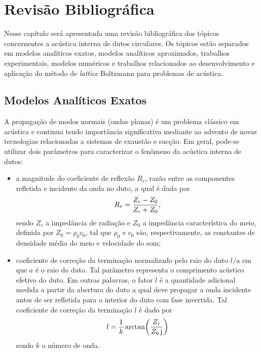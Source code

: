 \chapter{Revisão Bibliográfica}

Nesse capítulo será apresentada uma revisão bibliográfica dos tópicos concernentes a acústica interna de dutos circulares. Os tópicos estão separados em modelos analíticos exatos, modelos analíticos aproximados, trabalhos experimentais, modelos numéricos e trabalhos relacionados ao desenvolvimento e aplicação do método de \textit{lattice} Boltzmann para problemas de acústica.

\section{Modelos Analíticos Exatos} 

A propagação de modos normais (ondas planas) é um problema clássico em acústica e continua tendo importância significativa mediante ao advento de novas tecnologias relacionadas a sistemas de exaustão e sucção. Em geral, pode-se utilizar dois parâmetros para caracterizar o fenômeno da acústica interna de dutos:

\begin{itemize}
    \item a magnitude do coeficiente de reflexão $R_{r}$, razão entre as componentes refletida e incidente da onda no duto, a qual é dada por
    \begin{equation}
        R_{r}\simbolo{$R_{r}$}{Coeficiente de reflexão na terminação do duto} =\frac{Z_{r} - Z_{0}}{Z_{r} + Z_{0}},
        \label{eq:R}
    \end{equation}
    sendo $Z_{r}$ a impedância de radiação e $Z_{0}$ a impedância característica do meio, definida por $Z_{0} = \rho_{0}c_{0}$, tal que $\rho_{0}$ e $c_{0}$ são, respectivamente, as constantes de densidade média do meio e velocidade do som;
    
    \item coeficiente de correção da terminação normalizado pelo raio do duto $l/a$ em que $a$ é o raio do duto. Tal parâmetro representa o comprimento acústico efetivo do duto. Em outras palavras, o fator $l$ é a quantidade adicional medida a partir da abertura do duto a qual deve propagar a onda incidente antes de ser refletida para o interior do duto com fase invertida. Tal coeficiente de correção da terminação $l$ é dado por
    \begin{equation}
        l = \frac{1}{k} \arctan\!\left(\frac{Z_{r}}{Z_{0} \, \mathrm{j}\simbolo{$j$}{Unidade imaginária}}\right)
        \label{eq:l}
    \end{equation}
    sendo $k$ o número de onda.
\end{itemize}

